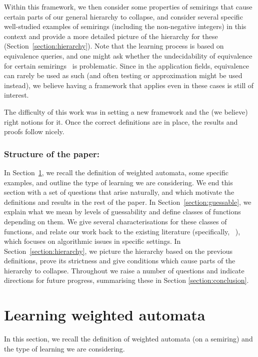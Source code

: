 \documentclass{lmcs}
\numberwithin{theorem}{section}
\begin{document}
Within this framework, we then consider some properties of semirings that cause certain parts of our general hierarchy to collapse, and consider several specific well-studied examples of semirings (including the non-negative integers) in this context and provide a more detailed picture of the hierarchy for these (Section~\ref{section:hierarchy}). Note that the learning process is based on equivalence queries, and one might ask whether the undecidability of equivalence for certain semirings~\cite{Krob92} is problematic. Since in the application fields, equivalence can rarely be used as such (and often testing or approximation might be used instead), we believe having a framework that applies even in these cases is still of interest.

The difficulty of this work was in setting a new framework and the (we believe) right notions for it. Once the correct definitions are in place, the results and proofs follow nicely. 

\subsubsection*{\textbf{Structure of the paper:}} In Section~\ref{section:prelim}, we recall the definition of weighted automata, some specific examples, and outline the type of learning we are considering. We end this section with a set of questions that arise naturally, and which motivate the definitions and results in the rest of the paper. In Section~\ref{section:guessable}, we explain what we mean by levels of guessability and define classes of functions depending on them. We give several characterisations for these classes of functions, and relate our work back to the existing literature (specifically, ~\cite{HKRS20}), which focuses on algorithmic issues in specific settings. In Section~\ref{section:hierarchy}, we picture the hierarchy based on the previous definitions, prove its strictness and give conditions which cause parts of the hierarchy to collapse. Throughout we raise a number of questions and indicate directions for future progress, summarising these in Section \ref{section:conclusion}.

\section{Learning weighted automata}
\label{section:prelim}

In this section, we recall the definition of weighted automata (on a semiring) and the type of learning we are considering.
\end{document}
